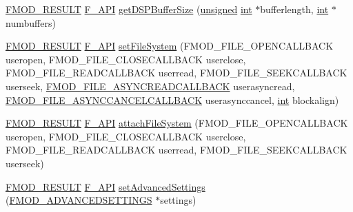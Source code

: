 \begin{DoxyCompactItemize}
\item 
\hyperlink{fmod_8h_ae6ddadf8cb315e93ae7e6456b19db276}{F\-M\-O\-D\-\_\-\-R\-E\-S\-U\-L\-T} \hyperlink{fmod_8h_ace803d13e798b0cdde4384f9f323b901}{F\-\_\-\-A\-P\-I} \hyperlink{class_f_m_o_d_1_1_system_a2aa3e1c3193075a3dac5fd35361f8df5}{get\-D\-S\-P\-Buffer\-Size} (\hyperlink{_free_image_8h_a425076c7067a1b5166e2cc530e914814}{unsigned} \hyperlink{wglew_8h_a500a82aecba06f4550f6849b8099ca21}{int} $\ast$bufferlength, \hyperlink{wglew_8h_a500a82aecba06f4550f6849b8099ca21}{int} $\ast$numbuffers)
\item 
\hyperlink{fmod_8h_ae6ddadf8cb315e93ae7e6456b19db276}{F\-M\-O\-D\-\_\-\-R\-E\-S\-U\-L\-T} \hyperlink{fmod_8h_ace803d13e798b0cdde4384f9f323b901}{F\-\_\-\-A\-P\-I} \hyperlink{class_f_m_o_d_1_1_system_a5dc43bac9fbd400109dc17464f07c5eb}{set\-File\-System} (F\-M\-O\-D\-\_\-\-F\-I\-L\-E\-\_\-\-O\-P\-E\-N\-C\-A\-L\-L\-B\-A\-C\-K useropen, F\-M\-O\-D\-\_\-\-F\-I\-L\-E\-\_\-\-C\-L\-O\-S\-E\-C\-A\-L\-L\-B\-A\-C\-K userclose, F\-M\-O\-D\-\_\-\-F\-I\-L\-E\-\_\-\-R\-E\-A\-D\-C\-A\-L\-L\-B\-A\-C\-K userread, F\-M\-O\-D\-\_\-\-F\-I\-L\-E\-\_\-\-S\-E\-E\-K\-C\-A\-L\-L\-B\-A\-C\-K userseek, \hyperlink{fmod_8h_a46af338d4692ce939b00d78e569b2f25}{F\-M\-O\-D\-\_\-\-F\-I\-L\-E\-\_\-\-A\-S\-Y\-N\-C\-R\-E\-A\-D\-C\-A\-L\-L\-B\-A\-C\-K} userasyncread, \hyperlink{fmod_8h_a3bd0b88cc82464de6af754334b88ae1e}{F\-M\-O\-D\-\_\-\-F\-I\-L\-E\-\_\-\-A\-S\-Y\-N\-C\-C\-A\-N\-C\-E\-L\-C\-A\-L\-L\-B\-A\-C\-K} userasynccancel, \hyperlink{wglew_8h_a500a82aecba06f4550f6849b8099ca21}{int} blockalign)
\item 
\hyperlink{fmod_8h_ae6ddadf8cb315e93ae7e6456b19db276}{F\-M\-O\-D\-\_\-\-R\-E\-S\-U\-L\-T} \hyperlink{fmod_8h_ace803d13e798b0cdde4384f9f323b901}{F\-\_\-\-A\-P\-I} \hyperlink{class_f_m_o_d_1_1_system_ab4314f764055fc5eae09febb194774ca}{attach\-File\-System} (F\-M\-O\-D\-\_\-\-F\-I\-L\-E\-\_\-\-O\-P\-E\-N\-C\-A\-L\-L\-B\-A\-C\-K useropen, F\-M\-O\-D\-\_\-\-F\-I\-L\-E\-\_\-\-C\-L\-O\-S\-E\-C\-A\-L\-L\-B\-A\-C\-K userclose, F\-M\-O\-D\-\_\-\-F\-I\-L\-E\-\_\-\-R\-E\-A\-D\-C\-A\-L\-L\-B\-A\-C\-K userread, F\-M\-O\-D\-\_\-\-F\-I\-L\-E\-\_\-\-S\-E\-E\-K\-C\-A\-L\-L\-B\-A\-C\-K userseek)
\item 
\hyperlink{fmod_8h_ae6ddadf8cb315e93ae7e6456b19db276}{F\-M\-O\-D\-\_\-\-R\-E\-S\-U\-L\-T} \hyperlink{fmod_8h_ace803d13e798b0cdde4384f9f323b901}{F\-\_\-\-A\-P\-I} \hyperlink{class_f_m_o_d_1_1_system_a8e7c0f550c5c540d8889fb835992cff5}{set\-Advanced\-Settings} (\hyperlink{struct_f_m_o_d___a_d_v_a_n_c_e_d_s_e_t_t_i_n_g_s}{F\-M\-O\-D\-\_\-\-A\-D\-V\-A\-N\-C\-E\-D\-S\-E\-T\-T\-I\-N\-G\-S} $\ast$settings)

\end{DoxyCompactItemize}
